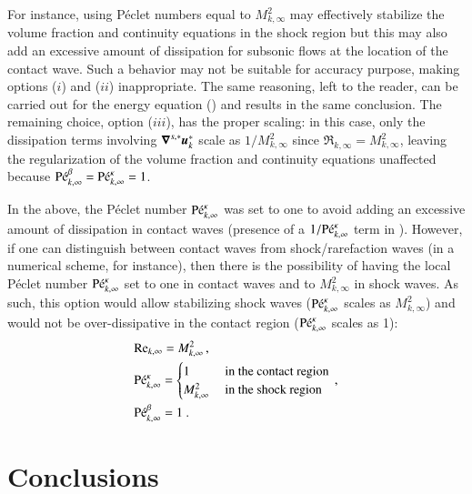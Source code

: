 \documentclass[preprint,10pt]{elsarticle}
\begin{document}
For instance, using P\'eclet numbers equal to $M_{k,\infty}^2$ may effectively stabilize the volume fraction and continuity 
equations in the shock region but this may also add an excessive amount of dissipation for subsonic 
flows at the location of the contact wave. Such a behavior may not be suitable for accuracy purpose, 
making options ($i$) and ($ii$) inappropriate. The same reasoning, left to the reader, can be carried out 
for the energy equation () and results in the same conclusion. The remaining 
choice, option ($iii$), has the proper scaling: in this case, only the dissipation terms involving 
$\boldsymbol\nabla^{s,*} \boldsymbol u_k^*$ scale as $1/M_{k,\infty}^2$ since $\Re_{k,\infty} = M_{k,\infty}^2$, leaving the 
regularization of the volume fraction and continuity equations unaffected because $\textrm{P\'e}_{k,\infty}^\beta = \textrm{P\'e}_{k,\infty}^\kappa =1$.
%
\begin{remark}
In the above, the P\'eclet number $\textrm{P\'e}_{k,\infty}^\kappa$ was set to one to avoid adding an excessive amount of dissipation in contact waves
(presence of a $1/\textrm{P\'e}_{k,\infty}^\kappa$ term in ). 
However, if one can distinguish between contact waves from shock/rarefaction waves (in a numerical scheme, for instance), then there is the possibility of having the local P\'eclet number $\textrm{P\'e}_{k,\infty}^\kappa$ set to one in contact waves and to $M^2_{k,\infty}$ in shock waves. 
As such, this option would allow stabilizing shock waves ($\textrm{P\'e}_{k,\infty}^\kappa$ scales as $M^2_{k,\infty}$) and would not be over-dissipative in the contact region ($\textrm{P\'e}_{k,\infty}^\kappa$ scales as 1):
%
\begin{align}
&\textrm{Re}_{k,\infty} = M_{k,\infty}^2 \,, \nonumber \\ 
& \textrm{P\'e}_{k,\infty}^\kappa = 
\begin{cases} 
1              & \text{ in the contact region} \\
M^2_{k,\infty} & \text{ in the shock region } 
\end{cases} \,,\nonumber \\ 
&\textrm{P\'e}_{k,\infty}^\beta = 1 \ . \nonumber
\end{align}
%
\end{remark}
%
\section{Conclusions}\label{sec:conclusion}
\end{document}
